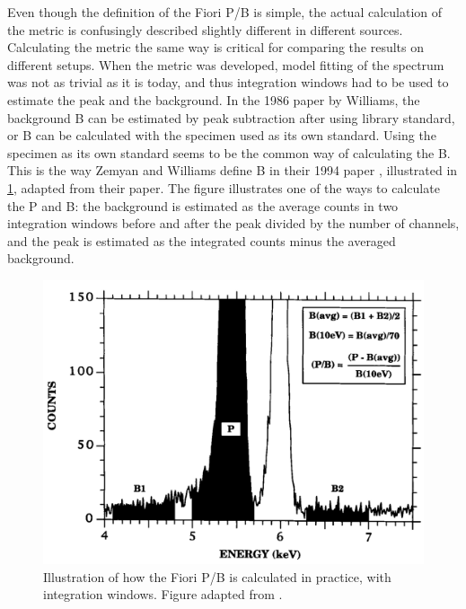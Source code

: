 Even though the definition of the Fiori P/B is simple, the actual calculation of the metric is confusingly described slightly different in different sources.
Calculating the metric the same way is critical for comparing the results on different setups.
When the metric was developed, model fitting of the spectrum was not as trivial as it is today, and thus integration windows had to be used to estimate the peak and the background.
In the 1986 paper by Williams, the background B can be estimated by peak subtraction after using library standard, or B can be calculated with the specimen used as its own standard.
Using the specimen as its own standard seems to be the common way of calculating the B.
This is the way Zemyan and Williams define B in their 1994 paper \cite{zemyan_standard_performance_1994}, illustrated in  \cref{fig:fiori_pb_reality}, adapted from their paper.
The figure illustrates one of the ways to calculate the P and B: the background is estimated as the average counts in two integration windows before and after the peak divided by the number of channels, and the peak is estimated as the integrated counts minus the averaged background.




\begin{figure}[htbp]
    \centering
    \includegraphics[width=0.6\linewidth]{figures/FioriPB_reality_TODO_remake.png}
    \caption{
        Illustration of how the Fiori P/B is calculated in practice, with integration windows.
        Figure adapted from \cite{zemyan_standard_performance_1994}.
    }
    \label{fig:fiori_pb_reality}
\end{figure}


